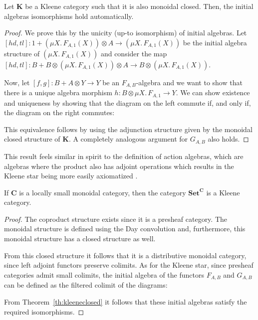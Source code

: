 \documentclass[acmsmall,anonymous,review,screen]{acmart}
\newcommand{\cat}[1]{\mathbf{#1}}
\begin{document}
\begin{theorem}
  \label{th:kleeneclosed}
  Let $\cat{K}$ be a Kleene category such that it is also monoidal
  closed.  Then, the initial algebras isomorphisms hold automatically.
\end{theorem}
\begin{proof}
  We prove this by the unicity (up-to isomorphism) of initial
  algebras. Let $[hd, tl]: 1 + (\mu X.\, F_{A, 1}(X)) \otimes A \to
  (\mu X.\, F_{A, 1}(X))$ be the initial algebra structure of $(\mu
  X.\, F_{A, 1}(X))$ and consider the map $[hd, tl] : B + B \otimes
  (\mu X.\, F_{A, 1}(X)) \otimes A \to B\otimes (\mu X.\, F_{A,
    1}(X))$.

  Now, let $[f,g] : B + A \otimes Y \to Y$ be an $F_{A,B}$-algebra and
  we want to show that there is a unique algebra morphism $h : B
  \otimes \mu X.\, F_{A,1} \to Y$. We can show existence and uniqueness
  by showing that the diagram on the left commute if, and only if,
  the diagram on the right commutes:

  This equivalence follows by using the adjunction structure given
  by the monoidal closed structure of $\cat{K}$. A completely analogous
  argument for $G_{A,B}$ also holds.
\end{proof}

This result feels similar in spirit to the definition of action
algebras, which are algebras where the product also has adjoint
operations which results in the Kleene star being more easily
axiomatized \cite{kozen1994}.


\begin{theorem}
  If $\cat{C}$ is a locally small monoidal category, then the category
  $\cat{Set}^{\cat{C}}$ is a Kleene category.
\end{theorem}
\begin{proof}
  The coproduct structure exists since it is a presheaf category. The
  monoidal structure is defined using the Day convolution and,
  furthermore, this monoidal structure has a closed structure as well.
  
  From this closed structure it follows that it is a distributive
  monoidal category, since left adjoint functors preserve colimits. As
  for the Kleene star, since presheaf categories admit small colimits,
  the initial algebra of the functors $F_{A,B}$ and $G_{A,B}$ can be
  defined as the filtered colimit of the diagrams:

  From Theorem~\ref{th:kleeneclosed} it follows that
  these initial algebras satisfy the required isomorphisms.
\end{proof}
\end{document}
